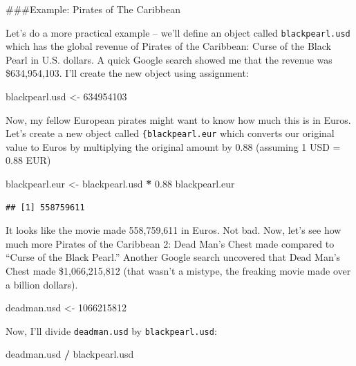 \documentclass[
]{book}
\newenvironment{Shaded}{\begin{snugshade}}{\end{snugshade}}
\newcommand{\DecValTok}[1]{\textcolor[rgb]{0.00,0.00,0.81}{#1}}
\newcommand{\FloatTok}[1]{\textcolor[rgb]{0.00,0.00,0.81}{#1}}
\newcommand{\NormalTok}[1]{#1}
\newcommand{\OperatorTok}[1]{\textcolor[rgb]{0.81,0.36,0.00}{\textbf{#1}}}
\newcommand{\StringTok}[1]{\textcolor[rgb]{0.31,0.60,0.02}{#1}}
\begin{document}
\#\#\#Example: Pirates of The Caribbean

Let's do a more practical example -- we'll define an object called \texttt{blackpearl.usd} which has the global revenue of Pirates of the Caribbean: Curse of the Black Pearl in U.S. dollars. A quick Google search showed me that the revenue was \$634,954,103. I'll create the new object using assignment:

\begin{Shaded}
\begin{Highlighting}[]
\NormalTok{blackpearl.usd <-}\StringTok{ }\DecValTok{634954103}
\end{Highlighting}
\end{Shaded}

Now, my fellow European pirates might want to know how much this is in Euros. Let's create a new object called \texttt{\{blackpearl.eur} which converts our original value to Euros by multiplying the original amount by 0.88 (assuming 1 USD = 0.88 EUR)

\begin{Shaded}
\begin{Highlighting}[]
\NormalTok{blackpearl.eur <-}\StringTok{ }\NormalTok{blackpearl.usd }\OperatorTok{*}\StringTok{ }\FloatTok{0.88}
\NormalTok{blackpearl.eur}
\end{Highlighting}
\end{Shaded}

\begin{verbatim}
## [1] 558759611
\end{verbatim}

It looks like the movie made 558,759,611 in Euros. Not bad. Now, let's see how much more Pirates of the Caribbean 2: Dead Man's Chest made compared to ``Curse of the Black Pearl.'' Another Google search uncovered that Dead Man's Chest made \$1,066,215,812 (that wasn't a mistype, the freaking movie made over a billion dollars).

\begin{Shaded}
\begin{Highlighting}[]
\NormalTok{deadman.usd <-}\StringTok{ }\DecValTok{1066215812}
\end{Highlighting}
\end{Shaded}

Now, I'll divide \texttt{deadman.usd} by \texttt{blackpearl.usd}:

\begin{Shaded}
\begin{Highlighting}[]
\NormalTok{deadman.usd }\OperatorTok{/}\StringTok{ }\NormalTok{blackpearl.usd}
\end{Highlighting}
\end{Shaded}
\end{document}
